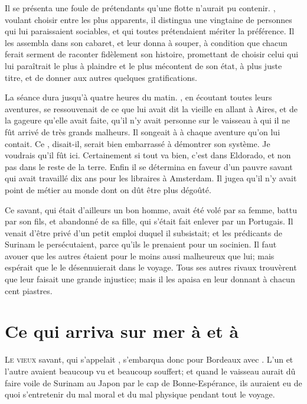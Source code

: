 Il se présenta une foule de prétendants qu’une flotte n’aurait pu
contenir. , voulant choisir entre les plus apparents, il
distingua une vingtaine de personnes qui lui paraissaient sociables, et
qui toutes prétendaient mériter la préférence. Il les assembla dans son
cabaret, et leur donna à souper, à condition que chacun ferait serment
de raconter fidèlement son histoire, promettant de choisir celui qui
lui paraîtrait le plus à plaindre et le plus mécontent de son état, à
plus juste titre, et de donner aux autres quelques gratifications.

La séance dura jusqu’à quatre heures du matin. , en écoutant
toutes leurs aventures, se ressouvenait de ce que lui avait dit la
vieille en allant à  Aires, et de la gageure qu’elle avait faite,
qu’il n’y avait personne sur le vaisseau à qui il ne fût arrivé de très
grands malheurs. Il songeait à  à chaque aventure qu’on lui
contait. Ce , disait-il, serait bien embarrassé à démontrer son
système. Je voudrais qu’il fût ici. Certainement si tout va bien, c’est
dans Eldorado, et non pas dans le reste de la terre. Enfin il se
détermina en faveur d’un pauvre savant qui avait travaillé dix ans pour
les libraires à Amsterdam. Il jugea qu’il n’y avait point de métier au
monde dont on dût être plus dégoûté.

Ce savant, qui était d’ailleurs un bon homme, avait été volé par sa
femme, battu par son fils, et abandonné de sa fille, qui s’était fait
enlever par un Portugais. Il venait d’être privé d’un petit emploi
duquel il subsistait; et les prédicants de Surinam le persécutaient,
parce qu’ils le prenaient pour un socinien. Il faut avouer que les
autres étaient pour le moins aussi malheureux que lui; mais 
espérait que le  le désennuierait dans le voyage. Tous ses autres
rivaux trouvèrent que  leur faisait une grande injustice; mais il
les apaisa en leur donnant à chacun cent piastres.



\chapter{Ce qui arriva sur mer à  et à }


\lettrine{L}{e vieux} savant, qui s’appelait , s’embarqua donc pour Bordeaux
avec . L’un et l’autre avaient beaucoup vu et beaucoup souffert;
et quand le vaisseau aurait dû faire voile de Surinam au Japon par le
cap de Bonne-Espérance, ils auraient eu de quoi s’entretenir du mal
moral et du mal physique pendant tout le voyage.



